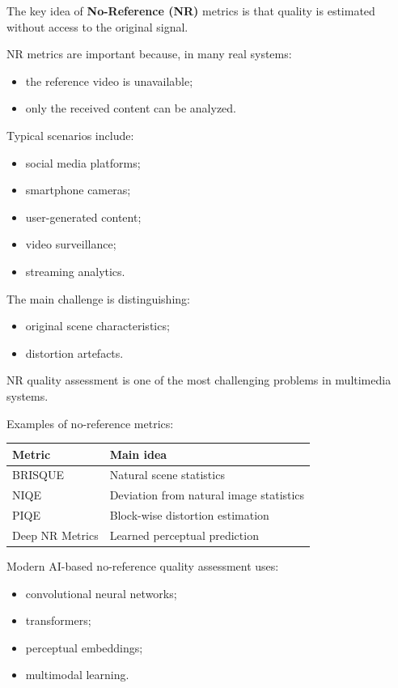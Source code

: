The key idea of \textbf{No-Reference (NR)} metrics is that quality is estimated without access to the original signal.

NR metrics are important because, in many real systems:

\begin{itemize}
\item the reference video is unavailable;
\item only the received content can be analyzed.
\end{itemize}

Typical scenarios include:

\begin{itemize}
\item social media platforms;
\item smartphone cameras;
\item user-generated content;
\item video surveillance;
\item streaming analytics.
\end{itemize}

The main challenge is distinguishing:

\begin{itemize}
\item original scene characteristics;
\item distortion artefacts.
\end{itemize}

NR quality assessment is one of the most challenging problems in multimedia systems.

Examples of no-reference metrics:

\begin{center}
\begin{tabular}{|l|l|}
\hline
\textbf{Metric} & \textbf{Main idea} \\ \hline
BRISQUE & Natural scene statistics \\ \hline
NIQE & Deviation from natural image statistics \\ \hline
PIQE & Block-wise distortion estimation \\ \hline
Deep NR Metrics & Learned perceptual prediction \\ \hline
\end{tabular}
\end{center}

Modern AI-based no-reference quality assessment uses:

\begin{itemize}
\item convolutional neural networks;
\item transformers;
\item perceptual embeddings;
\item multimodal learning.
\end{itemize}

